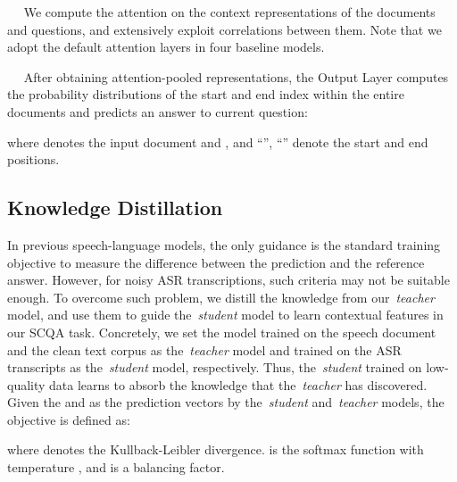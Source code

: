 \documentclass[11pt]{article}
\newcommand{\myparagraph}[1]{\vspace{2pt}\noindent{\bf{#1}}~~}
\begin{document}
\myparagraph{Attention Layer.}
We compute the attention on the context representations of the documents and questions, and extensively exploit correlations between them. Note that we adopt the default attention layers in four baseline models.

\myparagraph{Output Layer.}
After obtaining attention-pooled representations, the Output Layer computes the probability distributions of the start and end index within the entire documents and predicts an answer to current question:

where  denotes the input document  and , and ``'', ``'' denote the start and end positions.

\vspace{-0.5em}
\subsection{Knowledge Distillation}
\vspace{-0.5em}
\label{subsec:kd}
In previous speech-language models, the only guidance is the standard training objective to measure the difference between the prediction and the reference answer. However, for noisy ASR transcriptions, such criteria may not be suitable enough. To overcome such problem, we distill the knowledge from our~\textit{teacher} model, and use them to guide the~\textit{student} model to learn contextual features in our SCQA task. Concretely, we set the model trained on the speech document and the clean text corpus as the~\textit{teacher} model and trained on the ASR transcripts as the~\textit{student} model, respectively. Thus, the~\textit{student} trained on low-quality data learns to absorb the knowledge that the~\textit{teacher} has discovered. Given the  and  as the prediction vectors by the~\textit{student} and~\textit{teacher} models, the objective is defined as:

where  denotes the Kullback-Leibler divergence.  is the softmax function with temperature , and  is a  balancing factor.

\begin{table}[t]
   
    \vspace{-10pt}
    \centering
      \caption{Statistical analysis on Spoken-CoQA.}
    \label{tab:stats}
    \vspace{-10pt}
\end{table}
\end{document}
